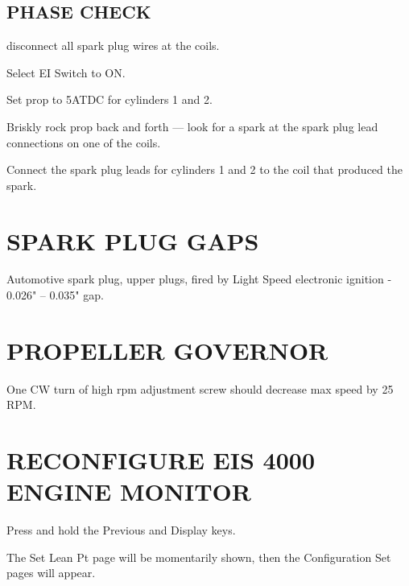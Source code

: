   \subsection{PHASE CHECK} 
  \begin{enumerate*}
  	\item disconnect all spark plug wires at the coils. 
  	\item Select EI Switch to ON. 
  	\item Set prop to 5\textdegree ATDC for cylinders 1 and 2. 
  	\item Briskly rock prop back and forth --- look for a spark at the spark plug lead connections on one of the coils. 
  	\item Connect the spark plug leads for cylinders 1 and 2 to the coil that produced the spark.
\end{enumerate*}

\section{SPARK PLUG GAPS}
Automotive spark plug, upper plugs, fired by Light Speed electronic ignition - 0.026" -- 0.035" gap.


\section{PROPELLER GOVERNOR}
One CW turn of high rpm adjustment screw should decrease max speed by 25 RPM. 

\section{RECONFIGURE EIS 4000 ENGINE MONITOR}
  \begin{enumerate*}
      \item Press and hold the Previous and Display keys.  
      \item The Set Lean Pt page will be momentarily shown, then the Configuration Set pages will appear.
\end{enumerate*}

